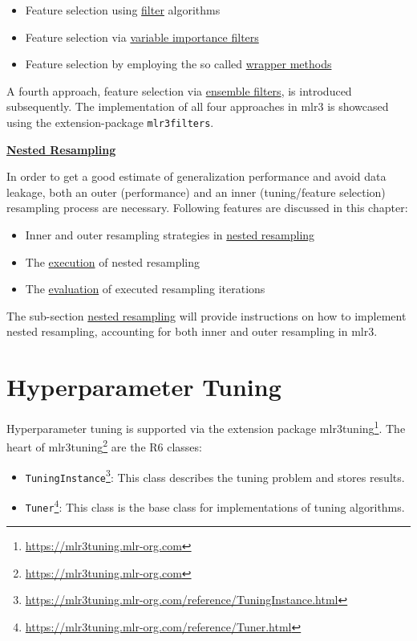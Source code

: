 \documentclass[12pt,]{scrbook}
\providecommand{\tightlist}{%
  \setlength{\itemsep}{0pt}\setlength{\parskip}{0pt}}
\renewcommand{\href}[2]{#2\footnote{\url{#1}}}
\begin{document}
\begin{itemize}
\tightlist
\item
  Feature selection using \protect\hyperlink{fs-filter}{filter} algorithms
\item
  Feature selection via \protect\hyperlink{fs-var-imp-filter}{variable importance filters}
\item
  Feature selection by employing the so called \protect\hyperlink{fs-wrapper}{wrapper methods}
\end{itemize}

A fourth approach, feature selection via \protect\hyperlink{fs-ensemble}{ensemble filters}, is introduced subsequently.
The implementation of all four approaches in mlr3 is showcased using the extension-package \texttt{mlr3filters}.

\protect\hyperlink{nested-resampling}{\textbf{Nested Resampling}}

In order to get a good estimate of generalization performance and avoid data leakage, both an outer (performance) and an inner (tuning/feature selection) resampling process are necessary.
Following features are discussed in this chapter:

\begin{itemize}
\tightlist
\item
  Inner and outer resampling strategies in \protect\hyperlink{nested-resampling}{nested resampling}
\item
  The \protect\hyperlink{nested-resamp-exec}{execution} of nested resampling
\item
  The \protect\hyperlink{nested-resamp-eval}{evaluation} of executed resampling iterations
\end{itemize}

The sub-section \protect\hyperlink{nested-resampling}{nested resampling} will provide instructions on how to implement nested resampling, accounting for both inner and outer resampling in mlr3.

\hypertarget{tuning}{%
\section{Hyperparameter Tuning}\label{tuning}}

Hyperparameter tuning is supported via the extension package \href{https://mlr3tuning.mlr-org.com}{mlr3tuning}.
The heart of \href{https://mlr3tuning.mlr-org.com}{mlr3tuning} are the R6 classes:

\begin{itemize}
\tightlist
\item
  \href{https://mlr3tuning.mlr-org.com/reference/TuningInstance.html}{\texttt{TuningInstance}}: This class describes the tuning problem and stores results.
\item
  \href{https://mlr3tuning.mlr-org.com/reference/Tuner.html}{\texttt{Tuner}}: This class is the base class for implementations of tuning algorithms.
\end{itemize}
\end{document}

